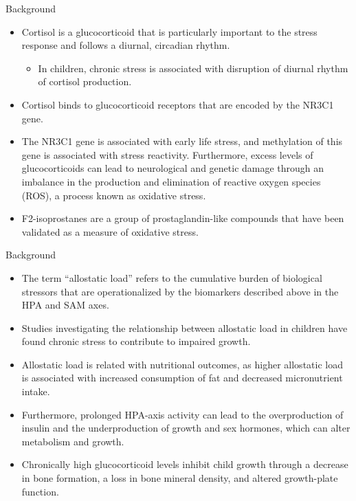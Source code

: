 \documentclass[
  ignorenonframetext,
]{beamer}
\providecommand{\tightlist}{%
  \setlength{\itemsep}{0pt}\setlength{\parskip}{0pt}}
\begin{document}
\begin{frame}{Background}
\protect\hypertarget{background-1}{}
\begin{itemize}[<+->]
\tightlist
\item
  Cortisol is a glucocorticoid that is particularly important to the
  stress response and follows a diurnal, circadian rhythm.

  \begin{itemize}[<+->]
  \tightlist
  \item
    In children, chronic stress is associated with disruption of diurnal
    rhythm of cortisol production.
  \end{itemize}
\item
  Cortisol binds to glucocorticoid receptors that are encoded by the
  NR3C1 gene.
\item
  The NR3C1 gene is associated with early life stress, and methylation
  of this gene is associated with stress reactivity. Furthermore, excess
  levels of glucocorticoids can lead to neurological and genetic damage
  through an imbalance in the production and elimination of reactive
  oxygen species (ROS), a process known as oxidative stress.
\item
  F2-isoprostanes are a group of prostaglandin-like compounds that have
  been validated as a measure of oxidative stress.
\end{itemize}
\end{frame}

\begin{frame}{Background}
\protect\hypertarget{background-2}{}
\begin{itemize}[<+->]
\tightlist
\item
  The term ``allostatic load'' refers to the cumulative burden of
  biological stressors that are operationalized by the biomarkers
  described above in the HPA and SAM axes.
\item
  Studies investigating the relationship between allostatic load in
  children have found chronic stress to contribute to impaired growth.
\item
  Allostatic load is related with nutritional outcomes, as higher
  allostatic load is associated with increased consumption of fat and
  decreased micronutrient intake.
\item
  Furthermore, prolonged HPA-axis activity can lead to the
  overproduction of insulin and the underproduction of growth and sex
  hormones, which can alter metabolism and growth.
\item
  Chronically high glucocorticoid levels inhibit child growth through a
  decrease in bone formation, a loss in bone mineral density, and
  altered growth-plate function.
\end{itemize}
\end{frame}
\end{document}
